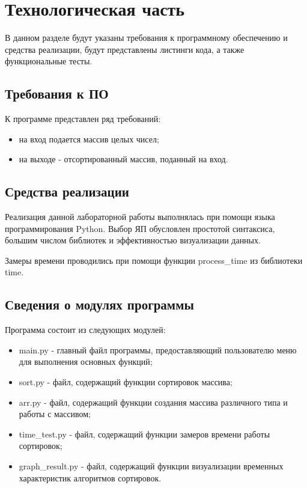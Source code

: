 \chapter{Технологическая часть}

В данном разделе будут указаны требования к программному обеспечению и средства реализации, будут представлены листинги кода, а также функциональные тесты.

\section{Требования к ПО}

К программе представлен ряд требований:

\begin{itemize}
	\item на вход подается массив целых чисел;
	\item на выходе - отсортированный массив, поданный на вход.
\end{itemize}

\section{Средства реализации}

Реализация данной лабораторной работы выполнялась при помощи языка программирования Python. Выбор ЯП обусловлен простотой синтаксиса, большим числом библиотек и эффективностью визуализации данных.

Замеры времени проводились при помощи функции process\_time из библиотеки time.

\section{Сведения о модулях программы}

Программа состоит из следующих модулей:

\begin{itemize}
	\item main.py - главный файл программы, предоставляющий пользователю меню для выполнения основных функций;
	\item sort.py - файл, содержащий функции сортировок массива;
	\item arr.py - файл, содержащий функции создания массива различного типа и работы с массивом;
	\item time\_test.py - файл, содержащий функции замеров времени работы сортировок;
	\item graph\_result.py - файл, содержащий функции визуализации временных характеристик алгоритмов сортировок.
\end{itemize}

